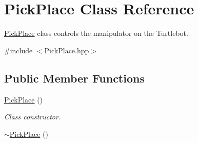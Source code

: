 \hypertarget{classPickPlace}{}\section{Pick\+Place Class Reference}
\label{classPickPlace}


\hyperlink{classPickPlace}{Pick\+Place} class controls the manipulator on the Turtlebot.  




{\ttfamily \#include $<$Pick\+Place.\+hpp$>$}

\subsection*{Public Member Functions}
\begin{DoxyCompactItemize}
\item 
\hyperlink{classPickPlace_add78282d6d4fa5db0f7606669d555633}{Pick\+Place} ()\hypertarget{classPickPlace_add78282d6d4fa5db0f7606669d555633}{}\label{classPickPlace_add78282d6d4fa5db0f7606669d555633}

\begin{DoxyCompactList}\small\item\em Class constructor. \end{DoxyCompactList}\item 
\hyperlink{classPickPlace_a621f6042ec47e137fd307e3763ede691}{$\sim$\+Pick\+Place} ()\hypertarget{classPickPlace_a621f6042ec47e137fd307e3763ede691}{}\label{classPickPlace_a621f6042ec47e137fd307e3763ede691}


\end{DoxyCompactItemize}

